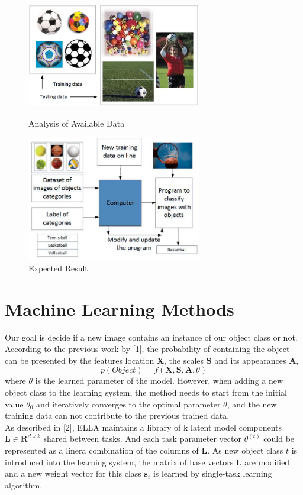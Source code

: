 \documentclass[CEJM,PDF]{cej} %
\begin{document}
\begin{figure}[htb]
\begin{minipage}[htb]{0.5\linewidth}
\centering
\includegraphics[width=3in]{Analysis_of_Available_Data}
\caption{Analysis of Available Data}
\label{fig:side:a}
\end{minipage}%
\begin{minipage}[htb]{0.5\linewidth}
\centering
\includegraphics[width=3in]{Expected_Result}
\caption{Expected Result}
\label{fig:side:b}
\end{minipage}
\end{figure}
\vspace*{-45pt}

\section{Machine Learning Methods}
\vspace*{-10pt}
Our goal is decide if a new image contains an instance of our object class or not. According to the previous work by [1], the probability of containing the object can be presented by the features location $\mathbf{X}$, the scales $\mathbf{S}$ and its appearances $\mathbf{A}$, 
\begin{equation}
p(Object) = f(\mathbf{X},\mathbf{S},\mathbf{A},\theta)
\end{equation}
where $\theta$ is the learned parameter of the model. However, when adding a new object class to the learning system, the method needs to start from the initial value $\theta_0$ and iteratively converges to the optimal parameter $\theta$, and the new training data can not contribute to the previous trained data. \\
As described in [2], ELLA maintains a library of k latent model components $\mathbf{L}\in\mathbf{R}^{d\times k}$ shared between tasks. And each task parameter vector $\theta^{(t)}$ could be represented as a linera combination of the columns of $\mathbf{L}$. As new object class $t$ is introduced into the learning system, the matrix of base vectors $\mathbf{L}$ are modified and a new weight vector for this class $\mathbf{s}_t$ is learned by single-task learning algorithm. 
\vspace*{-10pt}
\end{document}
